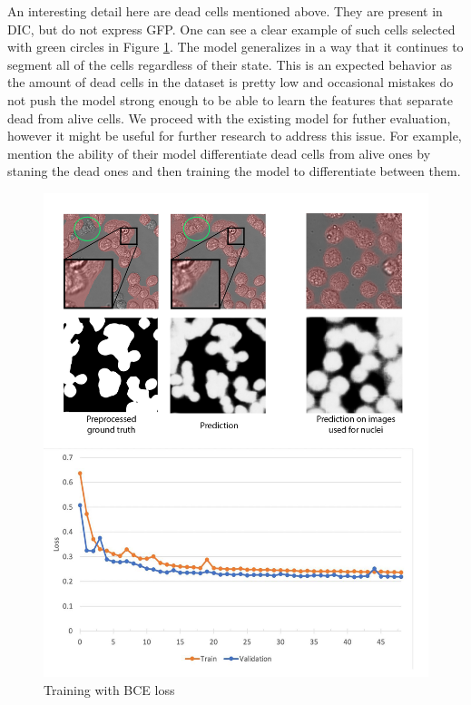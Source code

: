 An interesting detail here are dead cells mentioned above. They are present in DIC, but do not express GFP. One can see a clear example of such cells selected with green circles in Figure \ref{fig:gfp-bce-predictions}. The model generalizes in a way that it continues to segment all of the cells regardless of their state. This is an expected behavior as the amount of dead cells in the dataset is pretty low and occasional mistakes do not push the model strong enough to be able to learn the features that separate dead from alive cells. We proceed with the existing model for futher evaluation, however it might be useful for further research to address this issue. For example, \cite{Christiansen_2018} mention the ability of their model differentiate dead cells from alive ones by staning the dead ones and then training the model to differentiate between them. 

\begin{figure}[H]
	\begin{center}
		\includegraphics[width=0.8\linewidth]{bilder/gfp/binary-bce/enlarged.png}
		\caption{Training with BCE loss}\label{fig:gfp-bce-predictions}
	\end{center}
\end{figure}
